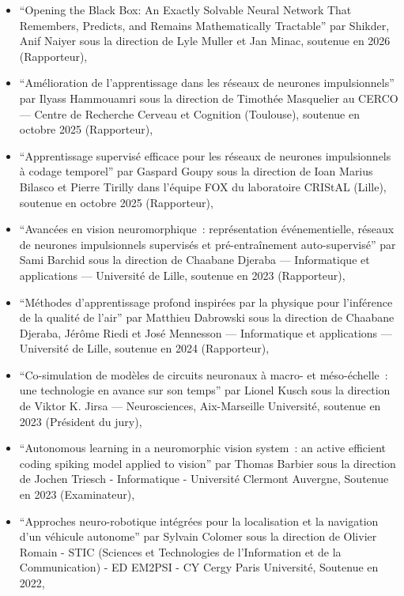 \documentclass[10pt,french,a4paper,oneside]{article}%
\begin{document}
\begin{itemize}
	\item ``Opening the Black Box: An Exactly Solvable Neural Network That Remembers, Predicts, and Remains Mathematically Tractable'' par Shikder, Anif Naiyer sous la direction de Lyle Muller et Jan Minac, soutenue en 2026 (Rapporteur),

	\item ``Amélioration de l'apprentissage dans les réseaux de neurones impulsionnels'' par Ilyass Hammouamri sous la direction de Timothée Masquelier au CERCO --- Centre de Recherche Cerveau et Cognition (Toulouse), soutenue en octobre 2025 (Rapporteur),

	\item ``Apprentissage supervisé efficace pour les réseaux de neurones impulsionnels à codage temporel'' par Gaspard Goupy sous la direction de Ioan Marius Bilasco et Pierre Tirilly dans l'équipe FOX du laboratoire CRIStAL (Lille), soutenue en octobre 2025 (Rapporteur),

	\item ``Avancées en vision neuromorphique~: représentation événementielle, réseaux de neurones impulsionnels supervisés et pré-entraînement auto-supervisé'' par Sami Barchid sous la direction de Chaabane Djeraba --- Informatique et applications --- Université de Lille, soutenue en 2023 (Rapporteur),

	\item ``Méthodes d'apprentissage profond inspirées par la physique pour l'inférence de la qualité de l'air'' par Matthieu Dabrowski sous la direction de Chaabane Djeraba, Jérôme Riedi et José Mennesson --- Informatique et applications --- Université de Lille, soutenue en 2024 (Rapporteur),

    \item ``Co-simulation de modèles de circuits neuronaux à macro- et méso-échelle~: une technologie en avance sur son temps'' par Lionel Kusch sous la direction de Viktor K. Jirsa --- Neurosciences, Aix-Marseille Université, soutenue en 2023 (Président du jury),

    \item ``Autonomous learning in a neuromorphic vision system~: an active efficient coding spiking model applied to vision'' par Thomas Barbier sous la direction de Jochen Triesch - Informatique - Université Clermont Auvergne, Soutenue en 2023  (Examinateur),

    \item ``Approches neuro-robotique intégrées pour la localisation et la navigation d'un véhicule autonome'' par Sylvain Colomer sous la direction de Olivier Romain - STIC (Sciences et Technologies de l'Information et de la Communication) - ED EM2PSI - CY Cergy Paris Université, Soutenue en 2022,


\end{itemize}
\end{document}

